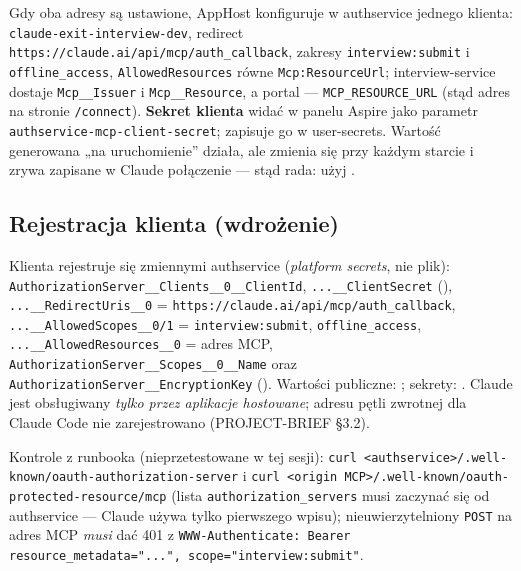 {Gdy oba adresy są ustawione, AppHost konfiguruje w authservice jednego klienta:
\texttt{claude-\allowbreak{}exit-\allowbreak{}interview-\allowbreak{}dev}, redirect
\texttt{https:\allowbreak{}/\allowbreak{}/\allowbreak{}claude.\allowbreak{}ai/\allowbreak{}api/\allowbreak{}mcp/\allowbreak{}auth\_\allowbreak{}callback}, zakresy
\texttt{interview:\allowbreak{}submit} i \texttt{offline\_access}, \texttt{AllowedResources}
równe \texttt{Mcp:ResourceUrl}; interview-service dostaje \texttt{Mcp\_\_Issuer} i
\texttt{Mcp\_\_Resource}, a portal --- \texttt{MCP\_\allowbreak{}RESOURCE\_\allowbreak{}URL} (stąd adres na
stronie \texttt{/connect}). \textbf{Sekret klienta} widać w panelu Aspire jako
parametr \texttt{authservice-\allowbreak{}mcp-\allowbreak{}client-\allowbreak{}secret};  zapisuje go w
user-secrets. Wartość generowana „na uruchomienie” działa, ale zmienia się przy
każdym starcie i zrywa zapisane w Claude połączenie --- stąd rada: użyj
.

\subsection{Rejestracja klienta (wdrożenie)}

Klienta rejestruje się zmiennymi authservice (\emph{platform secrets}, nie plik):
\texttt{AuthorizationServer\_\_Clients\_\_0\_\_ClientId}, \texttt{...\_\_ClientSecret}
(), \texttt{...\_\_RedirectUris\_\_0} =
\texttt{https://claude.ai/api/mcp/auth\_callback}, \texttt{...\_\_AllowedScopes\_\_0/1} =
\texttt{interview:\allowbreak{}submit}, \texttt{offline\_access}, \texttt{...\_\_AllowedResources\_\_0} = adres MCP,
\texttt{AuthorizationServer\_\_Scopes\_\_0\_\_Name} oraz
\texttt{AuthorizationServer\_\_EncryptionKey} (). Wartości
publiczne: ; sekrety: .
Claude jest obsługiwany \emph{tylko przez aplikacje hostowane}; adresu pętli zwrotnej
dla Claude Code nie zarejestrowano (PROJECT-BRIEF §3.2).

Kontrole z runbooka (nieprzetestowane w tej sesji): \texttt{curl <authservice>/.well-known/oauth-authorization-server} i
\texttt{curl <origin MCP>/.well-known/oauth-protected-resource/mcp} (lista \texttt{authorization\_servers}
musi zaczynać się od authservice --- Claude używa tylko pierwszego wpisu); nieuwierzytelniony \texttt{POST} na adres MCP \emph{musi}
dać 401 z \texttt{WWW-Authenticate: Bearer resource\_metadata="...", scope="interview:submit"}.

}
